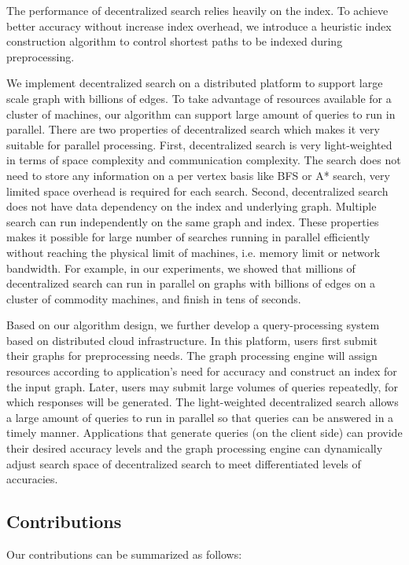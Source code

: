 The performance of decentralized search relies heavily on the index. To achieve better accuracy without increase index overhead, we introduce a heuristic index construction algorithm to control shortest paths to be indexed during preprocessing. 

We implement decentralized search on a distributed platform to support large scale graph with billions of edges. To take advantage of resources available for a cluster of machines, our algorithm can support large amount of queries to run in parallel. There are two properties of decentralized search which makes it very suitable for parallel processing. First, decentralized search is very light-weighted in terms of space complexity and communication complexity. The search does not need to store any information on a per vertex basis like BFS or A* search, very limited space overhead is required for each search. Second, decentralized search does not have data dependency on the index and underlying graph. Multiple search can run independently on the same graph and index. These properties makes it possible for large number of searches running in parallel efficiently without reaching the physical limit of machines, i.e. memory limit or network bandwidth. For example, in our experiments, we showed that millions of decentralized search can run in parallel on graphs with billions of edges on a cluster of commodity machines, and finish in tens of seconds. 

Based on our algorithm design, we further develop a query-processing system based on distributed cloud infrastructure. In this platform, users first submit their graphs for preprocessing needs. The graph processing engine will assign resources according to application's need for accuracy and construct an index for the input graph. Later, users may submit large volumes of queries repeatedly, for which responses will be generated. The light-weighted decentralized search allows a large amount of queries to run in parallel so that queries can be answered in a timely manner. Applications that generate queries (on the client side) can provide their desired accuracy levels and the graph processing engine can dynamically adjust search space of decentralized search to meet differentiated levels of accuracies.

\subsection{Contributions}
Our contributions can be summarized as follows:

